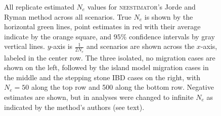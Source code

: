 \begin{landscape}
\begin{figure}[ht]
\centering
{}
\caption[ ~~~ - All replicate estimated $N_e$ values for \textsc{neestimator}'s Jorde and Ryman method across all scenarios.]{All replicate estimated $N_e$ values for \textsc{neestimator}'s Jorde and Ryman method across all scenarios. True $N_e$ is shown by the horizontal green lines, point estimates in red with their average indicate by the orange square, and $95\%$ confidence intervals by gray vertical lines. $y$-axis is $\frac{1}{2 N_e}$ and scenarios are shown across the $x$-axis, labeled in the center row. The three isolated, no migration cases are shown on the left, followed by the island model migration cases in the middle and the stepping stone IBD cases on the right, with $N_e = 50$ along the top row and 500 along the bottom row. Negative estimates are shown, but in analyses were changed to infinite $N_e$ as indicated by the method's authors (see text).}
\label{fig:supp_jorde}
\end{figure}



\end{landscape}
